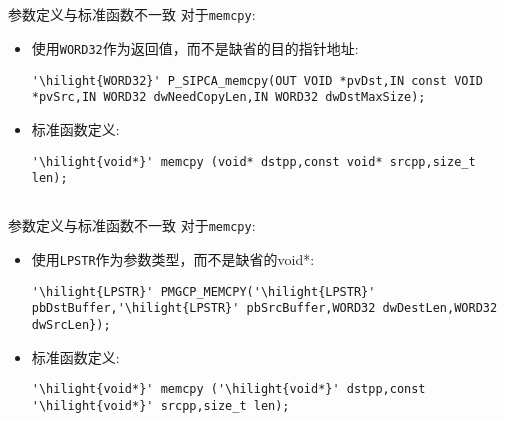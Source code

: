 ﻿\documentclass[hyperref={bookmarks=ture}xcolor=pdflatex,svgnames,table,compress]{beamer}
\begin{document}
\subsection{}
\begin{frame}[containsverbatim]{参数定义与标准函数不一致}
对于\lstinline{memcpy}:

\begin{itemize}
    \item 使用\lstinline{WORD32}作为返回值，而不是缺省的目的指针地址:
\begin{lstlisting}
'\hilight{WORD32}' P_SIPCA_memcpy(OUT VOID *pvDst,IN const VOID *pvSrc,IN WORD32 dwNeedCopyLen,IN WORD32 dwDstMaxSize);
\end{lstlisting}
    \item 标准函数定义:
\begin{lstlisting}
'\hilight{void*}' memcpy (void* dstpp,const void* srcpp,size_t len);
\end{lstlisting}
\end{itemize}
\end{frame}

\subsection{}
\begin{frame}[containsverbatim]{参数定义与标准函数不一致}
对于\lstinline{memcpy}:

\begin{itemize}
    \item 使用\lstinline{LPSTR}作为参数类型，而不是缺省的void*:
\begin{lstlisting}
'\hilight{LPSTR}' PMGCP_MEMCPY('\hilight{LPSTR}' pbDstBuffer,'\hilight{LPSTR}' pbSrcBuffer,WORD32 dwDestLen,WORD32 dwSrcLen});
\end{lstlisting}
    \item 标准函数定义:
\begin{lstlisting}
'\hilight{void*}' memcpy ('\hilight{void*}' dstpp,const '\hilight{void*}' srcpp,size_t len);
\end{lstlisting}
\end{itemize}
\end{frame}
\end{document}
